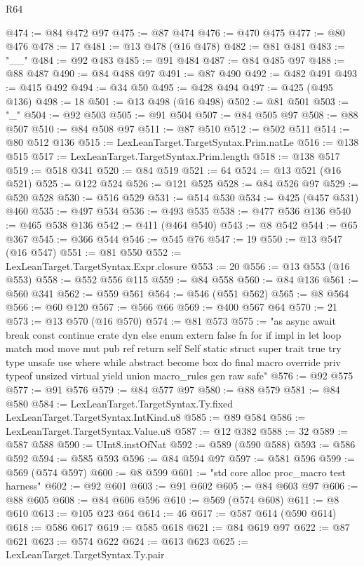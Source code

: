 \begin{lexlean}{R64}
\begin{coremodule}
@474 := @84 @472 @97
@475 := @87 @474
@476 := @470 @475
@477 := @80 @476
@478 := 17
@481 := @13 @478 (@16 @478)
@482 := @81 @481
@483 := "__"
@484 := @92 @483
@485 := @91 @484
@487 := @84 @485 @97
@488 := @88 @487
@490 := @84 @488 @97
@491 := @87 @490
@492 := @482 @491
@493 := @415 @492
@494 := @34 @50
@495 := @428 @494
@497 := @425 (@495 @136)
@498 := 18
@501 := @13 @498 (@16 @498)
@502 := @81 @501
@503 := "_"
@504 := @92 @503
@505 := @91 @504
@507 := @84 @505 @97
@508 := @88 @507
@510 := @84 @508 @97
@511 := @87 @510
@512 := @502 @511
@514 := @80 @512 @136
@515 := LexLeanTarget.TargetSyntax.Prim.natLe
@516 := @138 @515
@517 := LexLeanTarget.TargetSyntax.Prim.length
@518 := @138 @517
@519 := @518 @341
@520 := @84 @519
@521 := 64
@524 := @13 @521 (@16 @521)
@525 := @122 @524
@526 := @121 @525
@528 := @84 @526 @97
@529 := @520 @528
@530 := @516 @529
@531 := @514 @530
@534 := @425 (@457 @531) @460
@535 := @497 @534
@536 := @493 @535
@538 := @477 @536 @136
@540 := @465 @538 @136
@542 := @411 (@464 @540)
@543 := @8 @542
@544 := @65 @367
@545 := @366 @544
@546 := @545 @76
@547 := 19
@550 := @13 @547 (@16 @547)
@551 := @81 @550
@552 := LexLeanTarget.TargetSyntax.Expr.closure
@553 := 20
@556 := @13 @553 (@16 @553)
@558 := @552 @556 @115
@559 := @84 @558
@560 := @84 @136
@561 := @560 @341
@562 := @559 @561
@564 := @546 (@551 @562)
@565 := @8 @564
@566 := @60 @120
@567 := @566 @66
@569 := @400 @567 @64
@570 := 21
@573 := @13 @570 (@16 @570)
@574 := @81 @573
@575 := "as async await break const continue crate dyn else enum extern false fn for if impl in let loop match mod move mut pub ref return self Self static struct super trait true try type unsafe use where while abstract become box do final macro override priv typeof unsized virtual yield union macro_rules gen raw safe"
@576 := @92 @575
@577 := @91 @576
@579 := @84 @577 @97
@580 := @88 @579
@581 := @84 @580
@584 := LexLeanTarget.TargetSyntax.Ty.fixed LexLeanTarget.TargetSyntax.IntKind.u8
@585 := @89 @584
@586 := LexLeanTarget.TargetSyntax.Value.u8
@587 := @12 @382
@588 := 32
@589 := @587 @588
@590 := UInt8.instOfNat
@592 := @589 (@590 @588)
@593 := @586 @592
@594 := @585 @593
@596 := @84 @594 @97
@597 := @581 @596
@599 := @569 (@574 @597)
@600 := @8 @599
@601 := "std core alloc proc_macro test harness"
@602 := @92 @601
@603 := @91 @602
@605 := @84 @603 @97
@606 := @88 @605
@608 := @84 @606 @596
@610 := @569 (@574 @608)
@611 := @8 @610
@613 := @105 @23 @64
@614 := 46
@617 := @587 @614 (@590 @614)
@618 := @586 @617
@619 := @585 @618
@621 := @84 @619 @97
@622 := @87 @621
@623 := @574 @622
@624 := @613 @623
@625 := LexLeanTarget.TargetSyntax.Ty.pair

\end{coremodule}
\end{lexlean}
